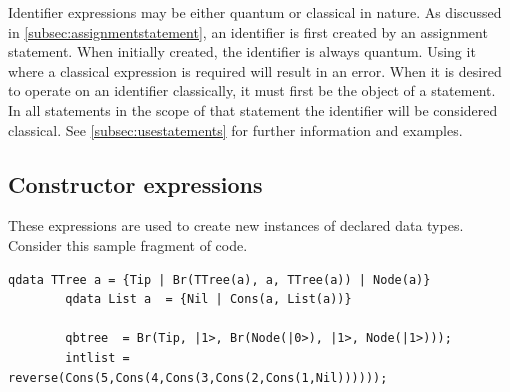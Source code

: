 Identifier expressions may be either quantum or classical in nature.
As discussed in \vref{subsec:assignmentstatement}, an identifier is
first created by an assignment statement. When initially created, the
identifier is always quantum. Using it where a classical expression is
required will result in an error. When it is desired to operate on an
identifier classically, it must first be the object
of a   statement.
In all statements in the scope of that  statement
the identifier will be considered classical. See \vref{subsec:usestatements}
for further information and examples.

\subsection{Constructor expressions}\label{subsec:constructorexpressions}
These expressions are used to create new instances of declared data types.
Consider this sample fragment of code.

{\begin{singlespace}
\begin{lstlisting}[style=linqpl]
        qdata TTree a = {Tip | Br(TTree(a), a, TTree(a)) | Node(a)}
        qdata List a  = {Nil | Cons(a, List(a))}

        qbtree  = Br(Tip, |1>, Br(Node(|0>), |1>, Node(|1>)));
        intlist = reverse(Cons(5,Cons(4,Cons(3,Cons(2,Cons(1,Nil))))));
\end{lstlisting}
\end{singlespace}
}

